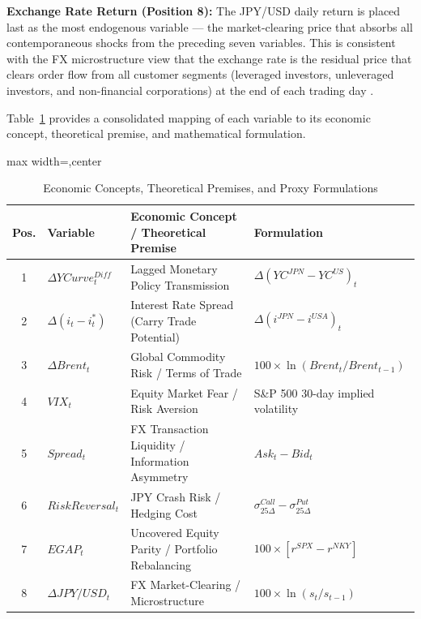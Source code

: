 \documentclass[12pt]{article}
\newenvironment{safetable}[1][\textwidth]{\begin{adjustbox}{max width=#1,center}}{\end{adjustbox}}
\begin{document}
\textbf{Exchange Rate Return (Position 8):} The JPY/USD daily return is placed last as the most endogenous variable --- the market-clearing price that absorbs all contemporaneous shocks from the preceding seven variables. This is consistent with the FX microstructure view that the exchange rate is the residual price that clears order flow from all customer segments (leveraged investors, unleveraged investors, and non-financial corporations) at the end of each trading day \parencite{evans2002order, lyons2001microstructure}.

{} Table~\ref{tab:identification_rationale} provides a consolidated mapping of each variable to its economic concept, theoretical premise, and mathematical formulation.

\begin{table}[H]
  \centering
  \begin{safetable}
    \begin{threeparttable}
      \caption{Economic Concepts, Theoretical Premises, and Proxy Formulations}
      \label{tab:identification_rationale}
      \begin{tabular}{clll}
        \toprule
        Pos. & Variable & Economic Concept / Theoretical Premise & Formulation \\
        \midrule
        1 & $\Delta YCurve^{Diff}_t$ & Lagged Monetary Policy Transmission \parencite{eichenbaum1995some} & $\Delta (YC^{JPN} - YC^{US})_t$ \\
        2 & $\Delta(i_t - i_t^*)$ & Interest Rate Spread (Carry Trade Potential) \parencite{brunnermeier2009carry} & $\Delta (i^{JPN} - i^{USA})_t$ \\
        3 & $\Delta Brent_t$ & Global Commodity Risk / Terms of Trade \parencite{habib2012getting} & $100 \times \ln(Brent_t/Brent_{t-1})$ \\
        4 & $VIX_t$ & Equity Market Fear / Risk Aversion \parencite{brunnermeier2009carry} & S\&P 500 30-day implied volatility \\
        5 & $Spread_t$ & FX Transaction Liquidity / Information Asymmetry \parencite{bollerslev1994bid} & $Ask_t - Bid_t$ \\
        6 & $RiskReversal_t$ & JPY Crash Risk / Hedging Cost \parencite{gagnon2007carry} & $\sigma_{25\Delta}^{Call} - \sigma_{25\Delta}^{Put}$ \\
        7 & $EGAP_t$ & Uncovered Equity Parity / Portfolio Rebalancing \parencite{hau2006exchange} & $100 \times [r^{SPX} - r^{NKY}]$ \\
        8 & $\Delta JPY/USD_t$ & FX Market-Clearing / Microstructure \parencite{evans2002order} & $100 \times \ln(s_t/s_{t-1})$ \\

\end{tabular}
\end{threeparttable}
\end{safetable}
\end{table}
\end{document}
